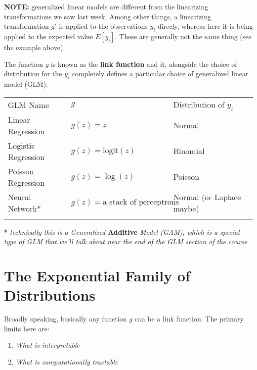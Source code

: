 \documentclass[
]{article}
\providecommand{\tightlist}{%
  \setlength{\itemsep}{0pt}\setlength{\parskip}{0pt}}
\begin{document}
\textbf{NOTE:} generalized linear models are different from the
linearizing transformations we saw last week. Among other things, a
linearizing transformation \(g'\) is applied to the observations \(y_i\)
direcly, whereas here it is being applied to the expected value
\(E[y_i]\). These are generally not the same thing (see the example
above).

The function \(g\) is known as the \textbf{link function} and it,
alongside the choice of distribution for the \(y_i\) completely defines
a particular choice of generalized linear model (GLM):

\begin{longtable}[]{@{}
  >{\raggedleft\arraybackslash}p{}
  >{\centering\arraybackslash}p{}
  >{\raggedright\arraybackslash}p{}@{}}
\toprule
GLM Name & \(g\) & Distribution of \(y_i\) \\ \addlinespace
\midrule
\endhead
Linear Regression & \(g(z)=z\) & Normal \\ \addlinespace
Logistic Regression & \(g(z) = \text{logit}(z)\) &
Binomial \\ \addlinespace
Poisson Regression & \(g(z)=\log{(z)}\) & Poisson \\ \addlinespace
Neural Network* & \(g(z) = \text{a stack of perceptrons}\) & Normal (or
Laplace maybe) \\ \addlinespace
\bottomrule
\end{longtable}

* \emph{technically this is a Generalized} \textbf{Additive} \emph{Model
(GAM), which is a special type of GLM that we'll talk about near the end
of the GLM section of the course}

\hypertarget{the-exponential-family-of-distributions}{%
\section{The Exponential Family of
Distributions}\label{the-exponential-family-of-distributions}}

Broadly speaking, basically any function \(g\) can be a link function.
The primary limits here are:

\begin{enumerate}
\def\labelenumi{\alph{enumi}.}
\tightlist
\item
  \emph{What is interpretable}
\item
  \emph{What is computationally tractable}
\end{enumerate}
\end{document}
